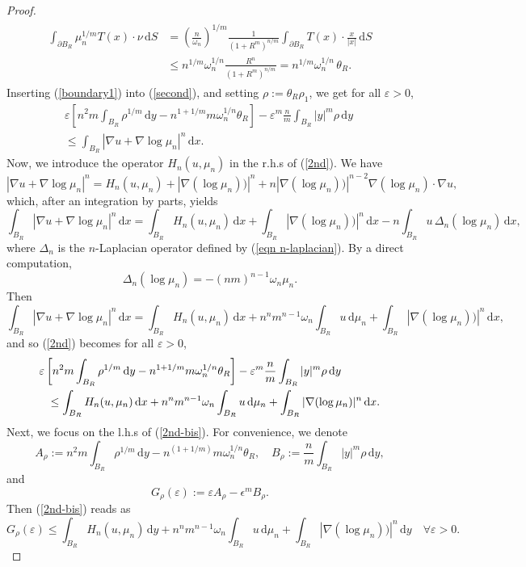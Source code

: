\documentclass[10pt]{article}
\numberwithin{equation}{section}
\theoremstyle{plain}
\theoremstyle{definition}
\theoremstyle{remark}
\newcommand{\ib}{\int_{B_R}}
\newcommand{\bs}{\begin{split}}
\newcommand{\es}{\end{split}}
\newcommand\vep{\varepsilon}
\newcommand\dd{\,\mbox{d} }
\begin{document}
\begin{proof}
\begin{align}\label{boundary1}
\bs
\int_{\partial B_R} \mu_n^{1/m} T(x)\cdot \nu \dd S &= \left(\frac{n}{\omega_n}  \right)^ {1/m} \frac{1}{(1+R^m)^{n/m}} \int_{\partial B_R} T(x)\cdot \frac{x}{|x|} \dd S \\
& \leq n^{1/m} \omega_n^ {1/n} \frac{R^n}{(1+R^m)^{n/m}} = n^{1/m} \omega_n^ {1/n}\,\theta_R.
\es
\end{align}
Inserting (\ref{boundary1}) into (\ref{second}), and setting $\rho :=\theta_R \rho_1$, we get for all $ \vep>0$, 
\begin{eqnarray}\label{2nd}
\varepsilon \left[n^2 m \ib \rho^{1/m} \dd y-  n^{1+1/m}m \omega_n^{1/n} \theta_R \right] - \varepsilon^m \frac{n}{m} \ib |y|^m \rho \dd y\ \nonumber \\
\leq \ib |\nabla u +\nabla \log \mu_n|^n \dd x. 
\end{eqnarray}
Now, we introduce the operator $H_n(u,\mu_n)$ in the r.h.s of (\ref{2nd}). We have
\[|\nabla u +\nabla \log \mu_n|^n = H_n(u,\mu_n) +  |\nabla(\log\mu_n))|^n + n |\nabla(\log\mu_n))|^{n-2}\nabla(\log\mu_n) \cdot \nabla u,\]
which, after an integration by parts, yields
\[\ib |\nabla u +\nabla \log \mu_n|^n \dd x = \ib H_n(u,\mu_n) \dd x +\ib |\nabla(\log\mu_n))|^n\dd x   - n\ib u\, \Delta_n(\log\mu_n)\dd x,\]
where $\Delta_n$ is the $n$-Laplacian operator defined by (\ref{eqn n-laplacian}).
 By a direct computation, 
\[\Delta_n(\log\mu_n) = -(nm)^{n-1}\omega_n\mu_n.\]
Then
\[\ib |\nabla u +\nabla \log \mu_n|^n \dd x = \ib H_n(u,\mu_n) \dd x + n^nm^{n-1}\omega_n\ib u\dd\mu_n +\ib |\nabla(\log\mu_n))|^n\dd x,\]
and so (\ref{2nd}) becomes for all $\vep>0$, 
\begin{eqnarray}\label{2nd-bis}
\lefteqn{ \varepsilon \left[n^2 m \ib \rho^{1/m} \dd y-  n^{1+1/m}m \omega_n ^{1/n} \theta_R \right] - \varepsilon^m \frac{n}{m} \ib |y|^m \rho \dd y} \nonumber \\
& & \leq \ib H_n(u,\mu_n) \dd x + n^nm^{n-1}\omega_n\ib u\dd\mu_n +\ib |\nabla(\log\mu_n)|^n\dd x.  
\end{eqnarray}
Next, we focus on the l.h.s of (\ref{2nd-bis}). For convenience, we denote 
\[A_\rho := n^2m \int_{B_R} \rho^{1/m} \dd y -n^{(1+1/m)}m\omega_n^{1/n}\theta_R, \quad B_\rho:= \frac{n}{m}\int_{B_R}|y|^m\rho \dd y,\]
and
\[G_\rho(\vep) := \vep A_\rho - \epsilon^m B_\rho.\]
Then (\ref{2nd-bis}) reads as
\begin{equation}\label{2nd-prime}
G_\rho(\vep) \leq \ib H_n(u,\mu_n) \dd y + n^nm^{n-1}\omega_n\ib u\dd\mu_n +\ib |\nabla(\log\mu_n))|^n\dd y  \quad  \forall \vep>0.

\end{equation}
\end{proof}
\end{document}
